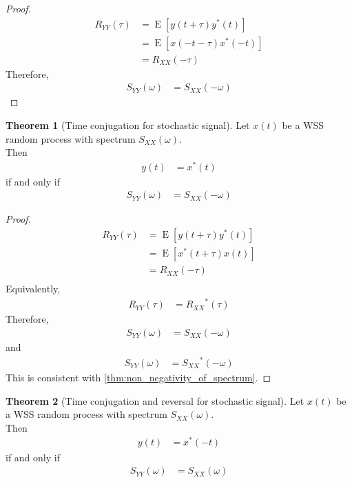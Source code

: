 \documentclass[titlepage, fleqn, a4paper, 12pt, twoside]{article}
\theoremstyle{definition}
\theoremstyle{theorem}
\newtheorem{theorem}{Theorem}
\DeclareMathOperator{\expct}{\mathrm{E}}
\begin{document}
\begin{proof}
	\begin{align*}
		R_{Y Y}(\tau) &= \expct\left[ y(t + \tau) y^*(t) \right]\\
		&= \expct\left[ x(-t - \tau) x^*(-t) \right]\\
		&= R_{X X}(-\tau)
	\end{align*}
	Therefore,
	\begin{align*}
		S_{Y Y}(\omega) &= S_{X X}(-\omega)
	\end{align*}
\end{proof}

\begin{theorem}[Time conjugation for stochastic signal]
	Let $x(t)$ be a WSS random process with spectrum $S_{X X}(\omega)$.\\
	Then
	\begin{align*}
		y(t) &= x^*(t)
	\end{align*}
	if and only if
	\begin{align*}
		S_{Y Y}(\omega) &= S_{X X}(-\omega)
	\end{align*}
	\label{thm:time_conjugation_for_stochastic_signal}
\end{theorem}

\begin{proof}
	\begin{align*}
		R_{Y Y}(\tau) &= \expct\left[ y(t + \tau) y^*(t) \right]\\
		&= \expct\left[ x^*(t + \tau) x(t) \right]\\
		&= R_{X X}(-\tau)\\
	\end{align*}
	Equivalently,
	\begin{align*}
		R_{Y Y}(\tau) &= {R_{X X}}^*(\tau)
	\end{align*}
	Therefore,
	\begin{align*}
		S_{Y Y}(\omega) &= S_{X X}(-\omega)
	\end{align*}
	and
	\begin{align*}
		S_{Y Y}(\omega) &= {S_{X X}}^*(-\omega)
	\end{align*}
	This is consistent with \cref{thm:non_negativity_of_spectrum}.
\end{proof}

\begin{theorem}[Time conjugation and reversal for stochastic signal]
	Let $x(t)$ be a WSS random process with spectrum $S_{X X}(\omega)$.\\
	Then
	\begin{align*}
		y(t) &= x^*(-t)
	\end{align*}
	if and only if
	\begin{align*}
		S_{Y Y}(\omega) &= S_{X X}(\omega)
	\end{align*}
	\label{thm:time_conjugation_and_reversal_for_stochastic_signal}
\end{theorem}
\end{document}
